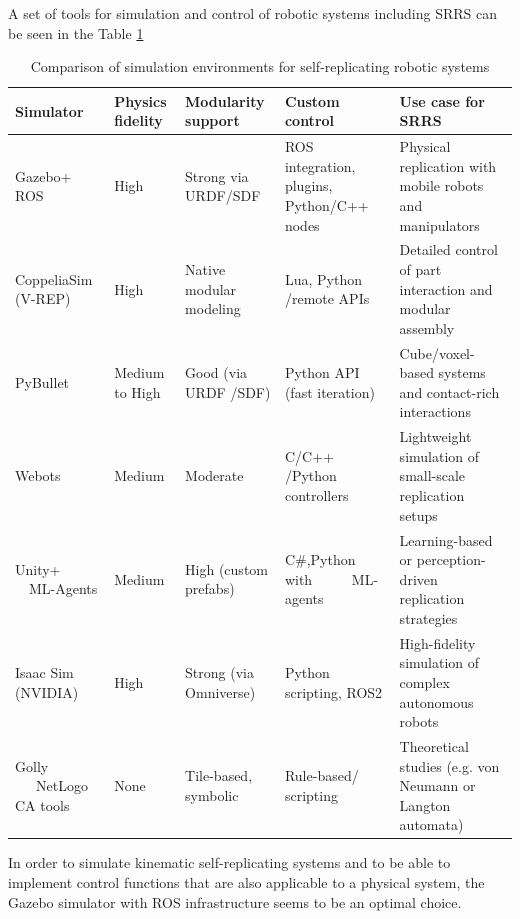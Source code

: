A set of tools for simulation and control of robotic systems including SRRS can be 
seen in the Table \ref{tab:tools}

\begin{table}[h!]
    \centering
    \begin{tabular}{|m{2cm}|m{1.5cm}|m{2cm}|m{2.5cm}|m{5cm}|}
        \hline
        \textbf{Simulator} & \textbf{Physics fidelity} & \textbf{Modularity support} &  \textbf{Custom control} & \textbf{Use case for SRRS} \\
        \hline
        Gazebo+ ROS &
        High &
        Strong via URDF/SDF &
        ROS integration, plugins, Python/C++ nodes &
        Physical replication with mobile robots and manipulators \\
        \hline
        CoppeliaSim (V-REP) &
        High &
        Native modular modeling &
        Lua, Python /remote APIs &
        Detailed control of part interaction and modular assembly \\
        \hline
        PyBullet &
        Medium to High &
        Good (via URDF /SDF) &
        Python API (fast iteration) &
        Cube/voxel-based systems and contact-rich interactions \\
        \hline
        Webots &
        Medium &
        Moderate &
        C/C++ /Python controllers &
        Lightweight simulation of small-scale replication setups \\
        \hline
        Unity+ \ \ ML-Agents &
        Medium &
        High (custom prefabs) &
        C\#,Python with \ \ \ \ \ ML-agents &
        Learning-based or perception-driven replication strategies \\
        \hline
        Isaac Sim (NVIDIA) &
        High &
        Strong (via Omniverse) &
        Python scripting, ROS2 &
        High-fidelity simulation of complex autonomous robots \\
        \hline
        Golly  \ \ \ NetLogo  CA tools &
        None &
        Tile-based, symbolic &
        Rule-based/ scripting &
        Theoretical studies (e.g. von Neumann or Langton automata) \\
        \hline
    \end{tabular}
    \caption{Comparison of simulation environments for self-replicating robotic systems}
    \label{tab:tools}
\end{table}

In order to simulate kinematic self-replicating systems and to be able to implement
control functions that are also applicable to a physical system, the Gazebo simulator 
with ROS infrastructure seems to be an optimal choice.

